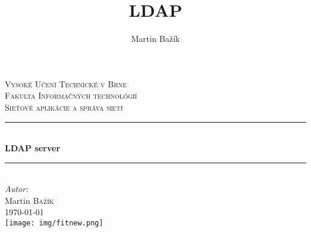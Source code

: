 \documentclass[11pt,a4paper]{article}
\title{LDAP}
\author{Martin Bažík}
\begin{document}
\begin{titlepage}

\newcommand{\HRule}{\rule{\linewidth}{0.5mm}} %

\center %
 

\textsc{\LARGE Vysoké Učení Technické v Brne}\\[1.5cm] %
\textsc{\Large Fakulta Informačných technológií}\\[0.5cm] %
\textsc{\large Sieťové aplikácie a správa sietí}\\[0.5cm] %


\HRule \\[0.4cm]
{ \huge \bfseries LDAP server}\\[0.4cm] %
\HRule \\[1.5cm]
 

\Large \emph{Autor:}\\
Martin \textsc{Bažík}\\[3cm] %


{\large \today}\\[2cm]


\texttt{[image: img/fitnew.png]}\\[1cm] 
\vfill

\end{titlepage}
\tableofcontents
\newpage
\end{document}
